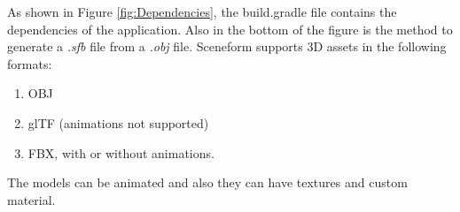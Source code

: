 As shown in Figure \ref{fig:Dependencies}, the build.gradle file contains the dependencies of the application. Also in the bottom of the figure is the method to generate a \textit{.sfb} file from a \textit{.obj} file. Sceneform supports 3D assets in the following formats:
\begin{enumerate}
    \item OBJ
    \item glTF (animations not supported)
    \item FBX, with or without animations.
\end{enumerate}
The models can be animated and also they can have textures and custom material\cite{Sceneform}.

\begin{figure}[ht]
    \begin{minipage}{0.5\textwidth}


\end{minipage}
\end{figure}
